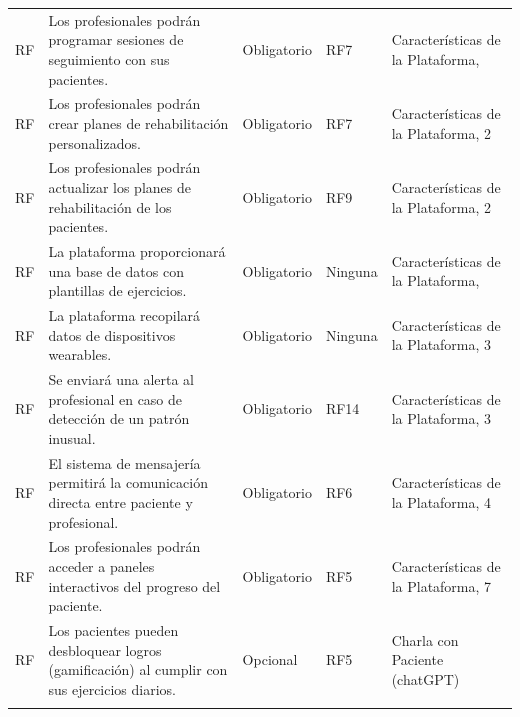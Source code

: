 \documentclass{article}
\begin{document}
\begin{longtable}{@{} p{1.5cm} p{5cm} p{3cm} p{2cm} p{3cm} @{}}
	\addlinespace \stepcounter{requisitosFuncionales}
	RF\therequisitosFuncionales & Los profesionales podrán programar sesiones de seguimiento con sus pacientes. & Obligatorio & RF7 & Características de la Plataforma,  \\ 
	\addlinespace \stepcounter{requisitosFuncionales}
	RF\therequisitosFuncionales & Los profesionales podrán crear planes de rehabilitación personalizados. & Obligatorio & RF7 & Características de la Plataforma, 2  \\ 
	\addlinespace \stepcounter{requisitosFuncionales}
	RF\therequisitosFuncionales & Los profesionales podrán actualizar los planes de rehabilitación de los pacientes. & Obligatorio & RF9 & Características de la Plataforma, 2 \\ 
	\addlinespace \stepcounter{requisitosFuncionales}
	RF\therequisitosFuncionales & La plataforma proporcionará una base de datos con plantillas de ejercicios. & Obligatorio & Ninguna & Características de la Plataforma,  \\ 

	\addlinespace \stepcounter{requisitosFuncionales}
	RF\therequisitosFuncionales & La plataforma recopilará datos de dispositivos wearables. & Obligatorio & Ninguna & Características de la Plataforma, 3 \\
	\addlinespace \stepcounter{requisitosFuncionales}
	RF\therequisitosFuncionales & Se enviará una alerta al profesional en caso de detección de un patrón inusual. & Obligatorio & RF14 & Características de la Plataforma, 3 \\
	\addlinespace \stepcounter{requisitosFuncionales}
	RF\therequisitosFuncionales & El sistema de mensajería permitirá la comunicación directa entre paciente y profesional. & Obligatorio & RF6 & Características de la Plataforma, 4 \\
	\addlinespace \stepcounter{requisitosFuncionales}
	
	RF\therequisitosFuncionales & Los profesionales podrán acceder a paneles interactivos del progreso del paciente. & Obligatorio & RF5 & Características de la Plataforma, 7  \\
	\addlinespace
	\stepcounter{requisitosFuncionales}RF\therequisitosFuncionales & Los pacientes pueden desbloquear logros (gamificación) al cumplir con sus ejercicios diarios. & Opcional & RF5 & Charla con Paciente (chatGPT) \\
	\addlinespace
	\bottomrule
\end{longtable}
\end{document}

